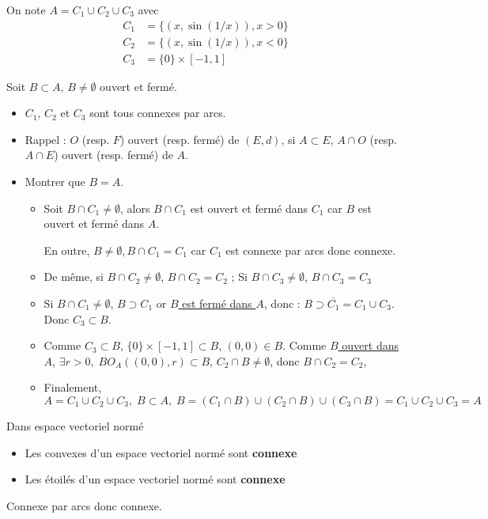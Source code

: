 \begin{myproof}
    On note $A = C_1 \cup C_2 \cup C_3$ avec
    \begin{align*}
        C_1 &= \{(x,\sin(1 / x)), x>0\}\\
        C_2 &= \{(x,\sin(1 / x)), x<0\}\\
        C_3 &= \{0\} \times [-1,1]
    \end{align*}
    
Soit $B \subset A$, $B \ne \emptyset$ ouvert et fermé.
\begin{itemize}
    \item $C_1$, $C_2$ et $C_3$ sont tous connexes par arcs.
    \item Rappel : $O$ (resp. $F$) ouvert (resp. fermé) de $(E, d)$, si $A \subset E$, $A \cap O$ (resp. $A \cap E$) ouvert (resp. fermé) de $A$.
    \item Montrer que $B=A$.
        \begin{itemize}
            \item Soit $B \cap C_1 \ne \emptyset$, alors $B \cap C_1$ est ouvert et fermé dans $C_1$ car $B$ est ouvert et fermé dans $A$.

            En outre, $B\ne \emptyset, B \cap C_1 = C_1$ car $C_1$ est connexe par arcs donc connexe.
            \item 
        De même, si $B \cap C_2 \ne \emptyset$, $B \cap C_2 = C_2$ ; Si $B \cap C_3 \ne \emptyset$, $B \cap C_3 = C_3$
    \item 
      Si $B \cap C_1 \ne \emptyset$,  $B \supset C_1$ or \underline{$B$ est fermé dans $A$}, donc :  $B \supset \overline{C_1} = C_1 \cup C_3$. Donc $C_3 \subset B$.
        \item
        Comme $C_3 \subset B$, $\{0\} \times [-1,1] \subset B$, $(0,0)\in B$. Comme \underline{$B$ ouvert dans $A$}, $\exists r>0,\; BO_A((0,0), r) \subset B$, $C_2 \cap B \ne \emptyset$,  donc $B \cap C_2 = C_2$,
     \item Finalement,
          $$A = C_1 \cup C_2 \cup C_3,  \; B \subset A, \; B = (C_1 \cap B) \cup (C_2 \cap B ) \cup (C_3\cap B) = C_1 \cup C_2 \cup C_3 =A$$
        \end{itemize}
\end{itemize}

\end{myproof}

\begin{Example}{Dans espace vectoriel normé}{}
    \begin{itemize}
        \item Les convexes d'un espace vectoriel normé sont \textbf{connexe} 
        \item Les étoilés d'un espace vectoriel normé sont \textbf{connexe}
    \end{itemize}
\end{Example}
\begin{myproof}
Connexe par arcs donc connexe.
\end{myproof}

